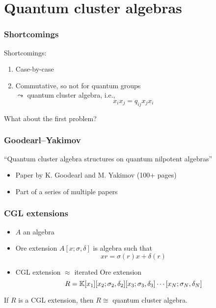 \documentclass[aspectratio=169]{beamer}
\begin{document}
\section{Quantum cluster algebras}

\begin{frame}
	\frametitle{Shortcomings}

	Shortcomings:
	\begin{enumerate}
		\item Case-by-case \pause
		\item Commutative, so not for quantum groups\\ \pause $\leadsto$ quantum cluster algebra,
		      i.e.,
		      \begin{equation*}
			      x_i x_j = q_{ij} x_j x_i
		      \end{equation*}
	\end{enumerate}

	\vspace{1em}
	\pause
	What about the first problem?

\end{frame}

\begin{frame}
	\frametitle{Goodearl--Yakimov}

	\begin{center}
		``Quantum cluster algebra structures on quantum nilpotent algebras''
	\end{center}
	\begin{itemize}
		\item Paper by K. Goodearl and M. Yakimov (100+ pages)
		\item Part of a series of multiple papers
	\end{itemize}

\end{frame}

\begin{frame}
	\frametitle{CGL extensions}
	\begin{itemize}
		\item $A$ an algebra
		\item Ore extension $A[x; \sigma, \delta]$ is algebra such that
		      \begin{equation*}
			      x r = \sigma(r) x + \delta(r)
		      \end{equation*}
		\item CGL extension $\approx$ iterated Ore extension
		      \begin{equation*}
			      R = \mathbb{K}[x_1][x_2; \sigma_2, \delta_2][x_3; \sigma_3, \delta_3] \dotsb [x_N; \sigma_N, \delta_N]
		      \end{equation*}
	\end{itemize}
	\begin{theorem}
		If $R$ is a CGL extension, then $R \cong$ quantum cluster algebra.
	\end{theorem}

\end{frame}
\end{document}
